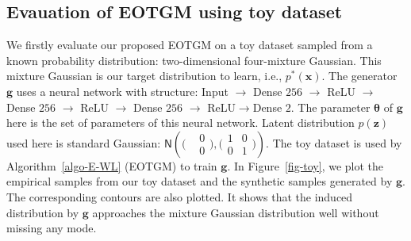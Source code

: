 \subsection{Evauation of EOTGM using toy dataset}\label{subsec-mg}

{We firstly evaluate our proposed EOTGM on a toy dataset sampled from a known probability distribution: two-dimensional four-mixture Gaussian. This mixture Gaussian is our target distribution to learn, i.e., $p^{\ast}(\bm{x})$. The generator $\bm{g}$ uses a neural network with structure: Input $\rightarrow$ Dense $256$ $\rightarrow$ ReLU $\rightarrow$ Dense $256$ $\rightarrow$ ReLU $\rightarrow$ Dense $256$ $\rightarrow$ ReLU$\rightarrow$Dense $2$. The parameter $\bm{\theta} $ of $\bm{g}$ here is the set of parameters of this neural network. Latent distribution $p(\bm{z})$ used here is standard Gaussian: $\mathsf{N}\left(\bigl(\begin{smallmatrix}& 0\\
    &0\end{smallmatrix}\bigr) ,\bigl( \begin{smallmatrix}1 & 0\\ 0 &
    1\end{smallmatrix}  \bigr)\right)$.
The toy dataset is used by Algorithm~\autoref{algo-E-WL} (EOTGM) to train $\bm{g}$. In Figure~\ref{fig-toy}, we plot the empirical samples from our toy dataset and the synthetic samples generated by $\bm{g}$. The corresponding contours are also plotted. It shows that the induced distribution by $\bm{g}$ approaches the mixture Gaussian distribution well without missing any mode.}          

